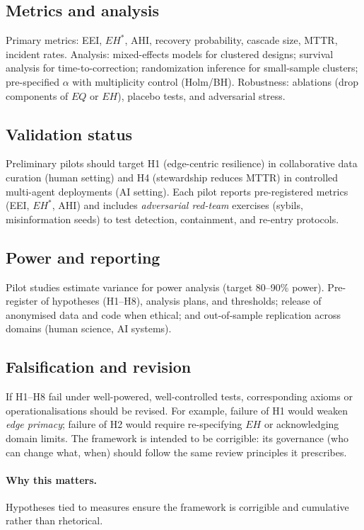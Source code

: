 \documentclass[12pt]{article}
\begin{document}
\subsection{Metrics and analysis}
Primary metrics: EEI, $EH^{\ast}$, AHI, recovery probability, cascade size, MTTR, incident rates. Analysis: mixed-effects models for clustered designs; survival analysis for time-to-correction; randomization inference for small-sample clusters; pre-specified $\alpha$ with multiplicity control (Holm/BH). Robustness: ablations (drop components of $EQ$ or $EH$), placebo tests, and adversarial stress.

\subsection{Validation status}
Preliminary pilots should target H1 (edge-centric resilience) in collaborative data curation (human setting) and H4 (stewardship reduces MTTR) in controlled multi-agent deployments (AI setting). Each pilot reports pre-registered metrics (EEI, $EH^{\ast}$, AHI) and includes \emph{adversarial red-team} exercises (sybils, misinformation seeds) to test detection, containment, and re-entry protocols.

\subsection{Power and reporting}
Pilot studies estimate variance for power analysis (target 80--90\% power). Pre-register of hypotheses (H1--H8), analysis plans, and thresholds; release of anonymised data and code when ethical; and out-of-sample replication across domains (human science, AI systems).

\subsection{Falsification and revision}
If H1--H8 fail under well-powered, well-controlled tests, corresponding axioms or operationalisations should be revised. For example, failure of H1 would weaken \emph{edge primacy}; failure of H2 would require re-specifying $EH$ or acknowledging domain limits. The framework is intended to be corrigible: its governance (who can change what, when) should follow the same review principles it prescribes.

\paragraph{Why this matters.} Hypotheses tied to measures ensure the framework is corrigible and cumulative rather than rhetorical.
\end{document}

